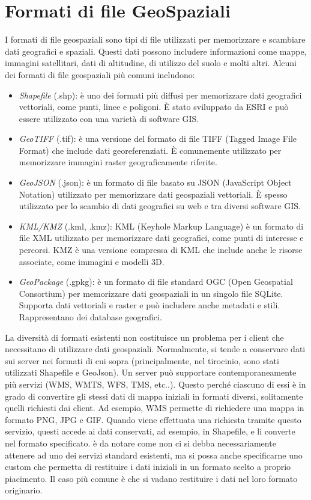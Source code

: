 \section{Formati di file GeoSpaziali}
I formati di file geospaziali sono tipi di file utilizzati per memorizzare e scambiare dati geografici e spaziali. Questi dati possono includere informazioni come mappe, immagini satellitari, dati di altitudine, di utilizzo del suolo e molti altri. Alcuni dei formati di file geospaziali più comuni includono:
\begin{itemize}
      \item \textit {Shapefile} (.shp): è uno dei formati più diffusi per memorizzare dati geografici vettoriali, come punti, linee e poligoni. È stato sviluppato da ESRI e può essere utilizzato con una varietà di software GIS.
      \item \textit {GeoTIFF} (.tif): è una versione del formato di file TIFF (Tagged Image File Format) che include dati georeferenziati. È comunemente utilizzato per memorizzare immagini raster geograficamente riferite.
      \item \textit {GeoJSON} (.json): è un formato di file basato su JSON (JavaScript Object Notation) utilizzato per memorizzare dati geospaziali vettoriali. È spesso utilizzato per lo scambio di dati geografici su web e tra diversi software GIS.
      \item \textit {KML/KMZ} (.kml, .kmz): KML (Keyhole Markup Language) è un formato di file XML utilizzato per memorizzare dati geografici, come punti di interesse e percorsi. KMZ è una versione compressa di KML che include anche le risorse associate, come immagini e modelli 3D.
      \item \textit {GeoPackage} (.gpkg): è un formato di file standard OGC (Open Geospatial Consortium) per memorizzare dati geospaziali in un singolo file SQLite. Supporta dati vettoriali e raster e può includere anche metadati e stili. Rappresentano dei database geografici.
\end{itemize}
La diversità di formati esistenti non costituisce un problema per i client che necessitano di utilizzare dati geospaziali. Normalmente,
si tende a conservare dati sui server nei formati di cui sopra (principalmente, nel tirocinio, sono stati utilizzati Shapefile e GeoJson). Un server può supportare contemporaneamente più servizi (WMS, WMTS, WFS, TMS, etc..). Questo perché ciascuno di essi è in grado di convertire gli stessi dati di mappa iniziali in formati diversi, solitamente quelli richiesti dai client.
Ad esempio, WMS permette di richiedere una mappa in formato PNG, JPG e GIF. Quando viene effettuata una richiesta tramite questo servizio, questi accede ai dati conservati, ad esempio, in Shapefile, e li converte nel formato specificato. è da notare come non ci si debba necessariamente attenere ad uno dei servizi standard esistenti, ma si possa anche specificarne uno custom che permetta di restituire i dati iniziali in un formato scelto a proprio piacimento. Il caso più comune è che si vadano restituire i dati nel loro formato originario.

